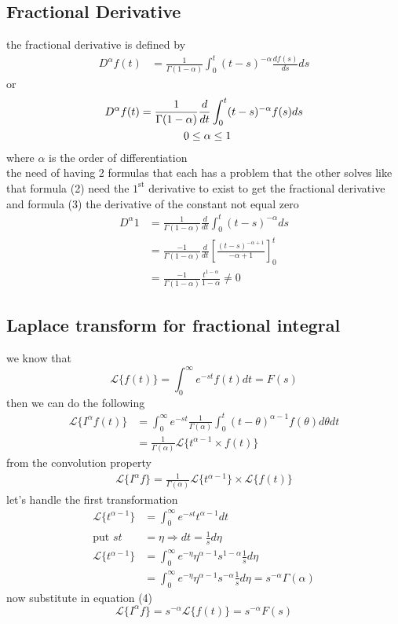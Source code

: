 \documentclass[]{article}
\begin{document}
\subsection{Fractional Derivative}
the fractional derivative is defined by 
\begin{align}
    D^{\alpha}f(t) &= \frac{1}{\Gamma(1-\alpha)}\int_{0}^{t}(t-s)^{-\alpha}\frac{d f(s)}{ds}ds    
\end{align}
or
\begin{align}
    D^{\alpha}f(t) &= \frac{1}{\Gamma(1-\alpha)}\frac{d}{dt}\int_{0}^{t}(t-s)^{-\alpha}f(s)ds
    \\\notag
    &\quad\quad\quad\quad0\leq \alpha \leq 1    
\end{align}
where $\alpha$ is the order of differentiation 
\\
the need of having 2 formulas that each has a problem that the other solves 
like that formula (2) need the $1^{\text{st}}$ derivative to exist to get the fractional derivative
and formula (3) the derivative of the constant not equal zero 
\begin{align*}
    D^{\alpha} 1 &= \frac{1}{\Gamma(1-\alpha)}\frac{d}{dt}\int_{0}^{t}(t-s)^{-\alpha}ds
    \\
    &= \frac{-1}{\Gamma(1-\alpha)}\frac{d}{dt} \left[\frac{(t-s)^{-\alpha+1}}{-\alpha+1}\right]_{0}^{t}
    \\
    &= \frac{-1}{\Gamma(1-\alpha)} \frac{t^{1-\alpha}}{1-\alpha} \neq 0
\end{align*}
\subsection{Laplace transform for fractional integral}
we know that 
\[
     \mathcal{L} \{f(t)\} = \int_{0}^{\infty}e^{-st}f(t)dt = F(s)
\]
then we can do the following
\begin{align*}
    \mathcal{L}\{I^{\alpha}f(t)\} &= \int_{0}^{\infty}e^{-st}\frac{1}{\Gamma(\alpha)}\int_{0}^{t}(t-\theta)^{\alpha-1}f(\theta)d\theta dt
    \\
    &= \frac{1}{\Gamma(\alpha)} \mathcal{L}\{t^{\alpha-1}\times f(t)\}
\end{align*}
from the convolution property
\begin{align}
    \mathcal{L}\{I^{\alpha}f\} = \frac{1}{\Gamma(\alpha)} \mathcal{L}\{t^{\alpha-1}\}\times \mathcal{L}\{f(t)\}
\end{align}
let's handle the first transformation
\begin{align*}
    \mathcal{L}\{t^{\alpha-1}\} &= \int_{0}^{\infty}e^{-st}t^{\alpha-1}dt 
     \\
    \text{put } st &= \eta \Longrightarrow dt = \frac{1}{s}d\eta
    \\
    \mathcal{L}\{t^{\alpha-1}\} &= \int_{0}^{\infty}e^{-\eta}\eta^{\alpha-1}s^{1-\alpha}\frac{1}{s}d\eta
    \\
    &= \int_{0}^{\infty}e^{-\eta}\eta^{\alpha-1}s^{-\alpha}\frac{1}{s}d\eta = s^{-\alpha}\Gamma(\alpha)
\end{align*}
now substitute in equation (4)
\[
    \mathcal{L}\{I^{\alpha}f\} = s^{-\alpha}\mathcal{L}\{f(t)\} = s^{-\alpha} F(s)
\]
\end{document}
